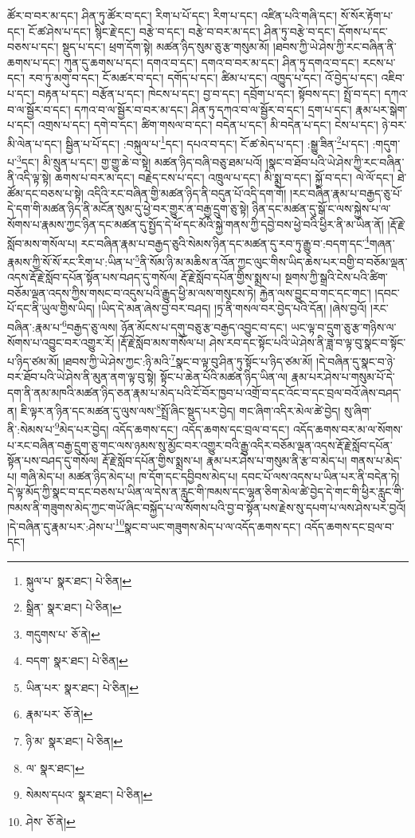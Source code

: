 ཚོར་བ་བར་མ་དང་། ཤིན་ཏུ་ཚོར་བ་དང་། རིག་པ་པོ་དང་། རིག་པ་དང་། འཛིན་པའི་གཞི་དང་། སོ་སོར་རྟོག་པ་དང་། ངོ་ཚ་ཤེས་པ་དང་། སྙིང་རྗེ་དང་། བརྩེ་བ་དང་། བརྩེ་བ་བར་མ་དང་། ཤིན་ཏུ་བརྩེ་བ་དང་། དོགས་པ་དང་བཅས་པ་དང་། སྡུད་པ་དང་། ཕྲག་དོག་སྟེ། མཚན་ཉིད་སུམ་ཅུ་རྩ་གསུམ་མོ། །ཐབས་ཀྱི་ཡེ་ཤེས་ཀྱི་རང་བཞིན་ནི་ཆགས་པ་དང་། ཀུན་དུ་ཆགས་པ་དང་། དགའ་བ་དང་། དགའ་བ་བར་མ་དང་། ཤིན་ཏུ་དགའ་བ་དང་། རངས་པ་དང་། རབ་ཏུ་མགུ་བ་དང་། ངོ་མཚར་བ་དང་། དགོད་པ་དང་། ཚིམ་པ་དང་། འཁྱུད་པ་དང་། འོ་བྱེད་པ་དང་། འཇིབ་པ་དང་། བརྟན་པ་དང་། བརྩོན་པ་དང་། ཁེངས་པ་དང་། བྱ་བ་དང་། དབྲོག་པ་དང་། སྟོབས་དང་། སྤྲོ་བ་དང་། དཀའ་བ་ལ་སྦྱོར་བ་དང་། དཀའ་བ་ལ་སྦྱོར་བ་བར་མ་དང་། ཤིན་ཏུ་དཀའ་བ་ལ་སྦྱོར་བ་དང་། དྲག་པ་དང་། རྣམ་པར་སྒེག་པ་དང་། འགྲས་པ་དང་། དགེ་བ་དང་། ཚིག་གསལ་བ་དང་། བདེན་པ་དང་། མི་བདེན་པ་དང་། ངེས་པ་དང་། ཉེ་བར་མི་ལེན་པ་དང་། སྦྱིན་པ་པོ་དང་། :བསྐུལ་པ་\footnote{སྐུལ་པ་  སྣར་ཐང་།  པེ་ཅིན། }དང་། དཔའ་བ་དང་། ངོ་ཚ་མེད་པ་དང་། :སྒྱུ་ཟིན་\footnote{སྒྲིན་  སྣར་ཐང་།  པེ་ཅིན། }པ་དང་། :གདུག་པ་\footnote{གདུགས་པ་  ཅོ་ནེ། }དང་། མི་སྲུན་པ་དང་། གྱ་གྱུ་ཆེ་བ་སྟེ། མཚན་ཉིད་བཞི་བཅུ་ཐམ་པའོ། །སྣང་བ་ཐོབ་པའི་ཡེ་ཤེས་ཀྱི་རང་བཞིན་ནི་འདི་ལྟ་སྟེ། ཆགས་པ་བར་མ་དང་། བརྗེད་ངས་པ་དང་། འཁྲུལ་པ་དང་། མི་སྨྲ་བ་དང་། སྐྱོ་བ་དང་། ལེ་ལོ་དང་། ཐེ་ཚོམ་དང་བཅས་པ་སྟེ། འདིའི་རང་བཞིན་གྱི་མཚན་ཉིད་ནི་བདུན་པོ་འདི་དག་གོ། །རང་བཞིན་རྣམ་པ་བརྒྱད་ཅུ་པོ་དེ་དག་གི་མཚན་ཉིད་ནི་མངོན་སུམ་དུ་ཕྱེ་བར་གྱུར་ན་བརྒྱ་དྲུག་ཅུ་སྟེ། ཉིན་དང་མཚན་དུ་སྒོ་ང་ལས་སྐྱེས་པ་ལ་སོགས་པ་རྣམས་ཀྱང་ཉིན་དང་མཚན་དུ་སྤྱོད་དེ་ཕོ་དང་མོའི་སྐྱེ་གནས་ཀྱི་དབྱེ་བས་ཕྱེ་བའི་ཕྱིར་ནི་མ་ཡིན་ནོ། །རྡོ་རྗེ་སློབ་མས་གསོལ་པ། རང་བཞིན་རྣམ་པ་བརྒྱད་ཅུའི་སེམས་ཉིན་དང་མཚན་དུ་རབ་ཏུ་རྒྱུ་བ་:བདག་དང་\footnote{བདག་  སྣར་ཐང་།  པེ་ཅིན། }གཞན་རྣམས་ཀྱི་སོ་སོ་རང་རིག་པ་:ཡིན་པ་\footnote{ཡིན་པར་  སྣར་ཐང་།  པེ་ཅིན། }ནི་སོམ་ཉི་མ་མཆིས་ན་འོན་ཀྱང་ལུང་གིས་ཡིད་ཆེས་པར་བགྱི་བ་བཅོམ་ལྡན་འདས་རྡོ་རྗེ་སློབ་དཔོན་སྟོན་པས་བཤད་དུ་གསོལ། རྡོ་རྗེ་སློབ་དཔོན་གྱིས་སྨྲས་པ། སྔགས་ཀྱི་སྒྲའི་ངེས་པའི་ཚིག་བཅོམ་ལྡན་འདས་ཀྱིས་གསང་བ་འདུས་པའི་རྒྱུད་ཕྱི་མ་ལས་གསུངས་ཏེ། རྐྱེན་ལས་བྱུང་བ་གང་དང་གང་། །དབང་པོ་དང་ནི་ཡུལ་གྱིས་ཡིད། །ཡིད་དེ་མན་ཞེས་བྱ་བར་བཤད། །ཏྲ་ནི་གསལ་བར་བྱེད་པའི་དོན། །ཞེས་བྱའོ། །རང་བཞིན་:རྣམ་པ་\footnote{རྣམ་པར་  ཅོ་ནེ། }བརྒྱད་ཅུ་ལས། ཉོན་མོངས་པ་དགུ་བཅུ་རྩ་བརྒྱད་འབྱུང་བ་དང་། ཡང་ལྟ་བ་དྲུག་ཅུ་རྩ་གཉིས་ལ་སོགས་པ་འབྱུང་བར་འགྱུར་རོ། །རྡོ་རྗེ་སློབ་མས་གསོལ་པ། ཤེས་རབ་དང་སྟོང་པའི་ཡེ་ཤེས་ནི་ཟླ་བ་ལྟ་བུ་སྣང་བ་སྟོང་པ་ཉིད་ཙམ་མོ། །ཐབས་ཀྱི་ཡེ་ཤེས་ཀྱང་:ཉི་མའི་\footnote{ཉི་མ་  སྣར་ཐང་།  པེ་ཅིན། }སྣང་བ་ལྟ་བུ་ཤིན་ཏུ་སྟོང་པ་ཉིད་ཙམ་མོ། །དེ་བཞིན་དུ་སྣང་བ་ཉེ་བར་ཐོབ་པའི་ཡེ་ཤེས་ནི་མུན་ནག་ལྟ་བུ་སྟེ། སྟོང་པ་ཆེན་པོའི་མཚན་ཉིད་ཡིན་ལ། རྣམ་པར་ཤེས་པ་གསུམ་པོ་དེ་དག་ནི་ནམ་མཁའི་མཚན་ཉིད་ཅན་རྣམ་པ་མེད་པའི་ངོ་བོར་ཁྱབ་པ་འགྲོ་བ་དང་འོང་བ་དང་བྲལ་བའོ་ཞེས་བཤད་ན། ཇི་ལྟར་ན་ཉིན་དང་མཚན་དུ་ལུས་ལས་\footnote{ལ་  སྣར་ཐང་། }སྤྲོ་ཞིང་སྡུད་པར་བྱེད། གང་ཞིག་འདིར་མེལ་ཚེ་བྱེད། སུ་ཞིག་ནི་:སེམས་པ་\footnote{སེམས་དཔའ་  སྣར་ཐང་།  པེ་ཅིན། }མེད་པར་བྱེད། འདོད་ཆགས་དང་། འདོད་ཆགས་དང་བྲལ་བ་དང་། འདོད་ཆགས་བར་མ་ལ་སོགས་པ་རང་བཞིན་བརྒྱ་དྲུག་ཅུ་གང་ལས་ཉམས་སུ་མྱོང་བར་འགྱུར་བའི་རྒྱུ་འདིར་བཅོམ་ལྡན་འདས་རྡོ་རྗེ་སློབ་དཔོན་སྟོན་པས་བཤད་དུ་གསོལ། རྡོ་རྗེ་སློབ་དཔོན་གྱིས་སྨྲས་པ། རྣམ་པར་ཤེས་པ་གསུམ་ནི་རྩ་བ་མེད་པ། གནས་པ་མེད་པ། གཞི་མེད་པ། མཚན་ཉིད་མེད་པ། ཁ་དོག་དང་དབྱིབས་མེད་པ། དབང་པོ་ལས་འདས་པ་ཡིན་པར་ནི་བདེན་ཏེ། དེ་ལྟ་མོད་ཀྱི་སྣང་བ་དང་བཅས་པ་ཡིན་ལ་དེས་ན་རླུང་གི་ཁམས་དང་ལྷན་ཅིག་མེལ་ཚེ་བྱེད་དེ་གང་གི་ཕྱིར་རླུང་གི་ཁམས་ནི་གཟུགས་མེད་ཀྱང་གཡོ་ཞིང་བསྐྱོད་པ་ལ་སོགས་པའི་བྱ་བ་སྟོན་པས་རྗེས་སུ་དཔག་པ་ལས་ཤེས་པར་བྱའོ། །དེ་བཞིན་དུ་རྣམ་པར་:ཤེས་པ་\footnote{ཤེས་  ཅོ་ནེ། }སྣང་བ་ཡང་གཟུགས་མེད་པ་ལ་འདོད་ཆགས་དང་། འདོད་ཆགས་དང་བྲལ་བ་དང་། 